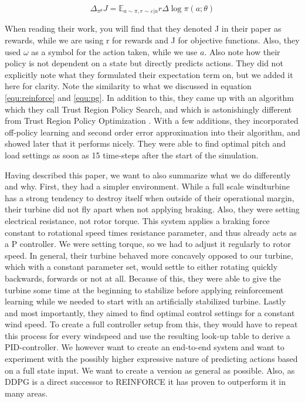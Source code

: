 \documentclass[hyperref,final,beleg]{cgvpub}
\begin{document}
\begin{equation}
\Delta_{\pi^{\theta}} J = \mathbb{E}_{a \sim \pi, r \sim \varepsilon | a} r \Delta \log \pi(a;\theta)
\end{equation}

When reading their work, you will find that they denoted J in their paper as rewards, while we are using r for rewards and J for objective functions. Also, they used $\omega$ as a symbol for the action taken, while we use $a$. Also note how their policy is not dependent on a state but directly predicts actions. They did not explicitly note what they formulated their expectation term on, but we added it here for clarity. Note the similarity to what we discussed in equation \ref{equ:reinforce} and \ref{equ:pg}. In addition to this, they came up with an algorithm which they call Trust Region Policy Search, and which is astonishingly different from Trust Region Policy Optimization \cite{schulmanTrustRegionPolicy2017}. With a few additions, they incorporated off-policy learning and second order error approximation into their algorithm, and showed later that it performs nicely. They were able to find optimal pitch and load settings as soon as 15 time-steps after the start of the simulation.

Having described this paper, we want to also summarize what we do differently and why. First, they had a simpler environment. While a full scale windturbine has a strong tendency to destroy itself when outside of their operational margin, their turbine did not fly apart when not applying braking. Also, they were setting electrical resistance, not rotor torque. This system applies a braking force constant to rotational speed times resistance parameter, and thus already acts as a P controller. We were setting torque, so we had to adjust it regularly to rotor speed. In general, their turbine behaved more concavely opposed to our turbine, which with a constant parameter set, would settle to either rotating quickly backwards, forwards or not at all. Because of this, they were able to give the turbine some time at the beginning to stabilize before applying reinforcement learning while we needed to start with an artificially stabilized turbine. Lastly and most importantly, they aimed to find optimal control settings for a constant wind speed. To create a full controller setup from this, they would have to repeat this process for every windspeed and use the resulting look-up table to derive a PID-controller. We however want to create an end-to-end system and want to experiment with the possibly higher expressive nature of predicting actions based on a full state input. We want to create a version as general as possible. Also, as \ac{DDPG} is a direct successor to \ac{REINFORCE} it has proven to outperform it in many areas.
\end{document}
